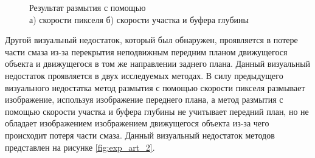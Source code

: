 \begin{figure}[H]
    \centering
    \begin{minipage}[h]{0.45\linewidth}
    \end{minipage}
    \hfill
    \begin{minipage}[h]{0.45\linewidth}
    \end{minipage}
    

    \caption{Результат размытия с помощью  \\ а) скорости пикселя б) скорости участка и буфера глубины}
    \label{fig:exp_art_1}
\end{figure} 


Другой визуальный недостаток, который был обнаружен, проявляется в потере части смаза из-за перекрытия неподвижным передним планом движущегося объекта и движущегося в том же направлении заднего плана. Данный визуальный недостаток проявляется в двух исследуемых методах. В силу предыдущего визуального недостатка метод размытия с помощью скорости пикселя размывает изображение, используя изображение переднего плана, а метод размытия с помощью скорости участка и буфера глубины не учитывает передний план, но не обладает изображением изображением движущегося объекта из-за чего происходит потеря части смаза. Данный визуальный недостаток методов представлен на рисунке \ref{fig:exp_art_2}.


